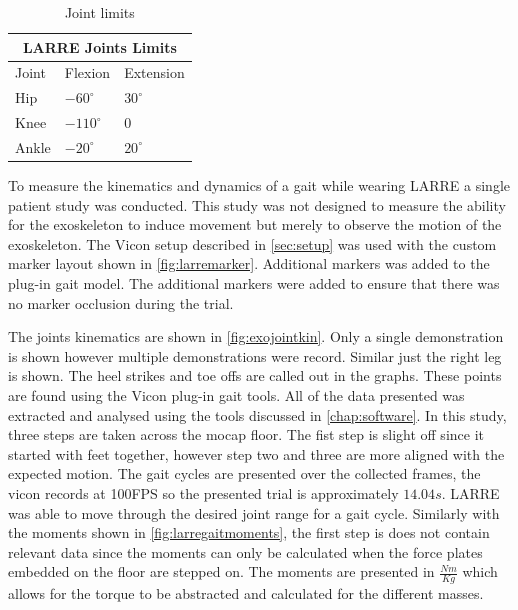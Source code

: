 \begin{table}[h!]
\begin{centering}
    \begin{tabular}{ |p{1cm} p{2cm} p{2cm} |  }
        \hline 
        \multicolumn{3}{|c|}{LARRE Joints Limits} \\
        \hline 
        Joint & Flexion & Extension \\
        \hline \hline
        Hip   & $-60^{\circ}$   & $30^{\circ}$  \\
        Knee &   $-110^{\circ}$  & $0$   \\
        Ankle & $-20^{\circ}$ & $20^{\circ}$  \\
        \hline
    \end{tabular}
    \caption[LARRE Joint Limits]{Joint limits}    \centering
    \label{tab:jointlimits}
\end{centering}
\end{table}


To measure the kinematics and dynamics of a gait while wearing LARRE a single patient study was conducted. This study was not designed to measure the ability for the exoskeleton to induce movement but merely to observe the motion of the exoskeleton. The Vicon setup described in \autoref{sec:setup} was used with the custom marker layout shown in \autoref{fig:larremarker}. Additional markers was added to the plug-in gait model. The additional markers were added to ensure that there was no marker occlusion during the trial. 

The joints kinematics are shown in \autoref{fig:exojointkin}. Only a single demonstration is shown however multiple demonstrations were record. Similar just the right leg is shown. The heel strikes and toe offs are called out in the graphs. These points are found using the Vicon plug-in gait tools. All of the data presented was extracted and analysed using the tools discussed in \autoref{chap:software}. In this study, three steps are taken across the mocap floor. The fist step is slight off since it started with feet together, however step two and three are more aligned with the expected motion. The gait cycles are presented over the collected frames, the vicon records at 100FPS so the presented trial is approximately $14.04s$. LARRE was able to move through the desired joint range for a gait cycle. Similarly with the moments shown in \autoref{fig:larregaitmoments}, the first step is does not contain relevant data since the moments can only be calculated when the force plates embedded on the floor are stepped on. The moments are presented in $\frac{Nm}{Kg}$ which allows for the torque to be abstracted and calculated for the different masses. 


